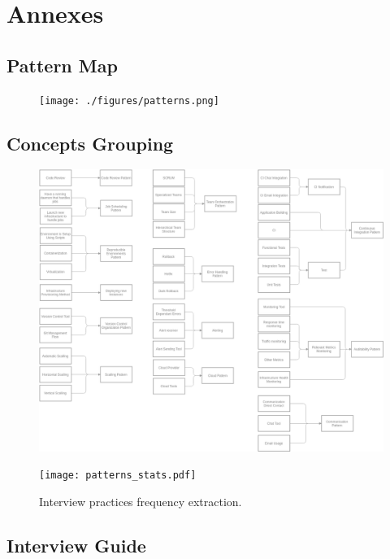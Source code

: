 \pagebreak
  \chapter{Annexes}
  \pagebreak

  \section{Pattern Map} \label{anex:pat:map}
    \begin{figure}[ht!]
        \texttt{[image: ./figures/patterns.png]}
    \end{figure}
\pagebreak
  \section{Concepts Grouping} \label{anex:pat:group}
    \begin{figure}[ht!]
        \includegraphics[width=1\linewidth]{./figures/concepts.png}
    \end{figure}
\pagebreak
\begin{landscape}
    \begin{figure}[ht!]
      \texttt{[image: patterns\_stats.pdf]}
      \caption{Interview practices frequency extraction.}
      \label{anex:pat:freq}
    \end{figure}
\end{landscape}

\pagebreak

  \section{Interview Guide} \label{anex:interview}
